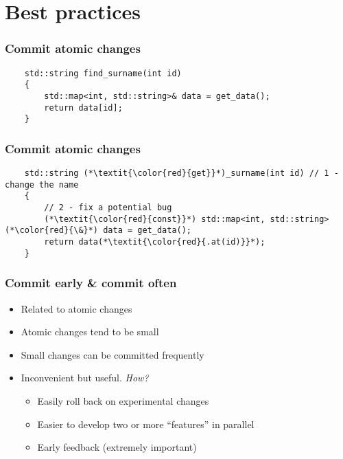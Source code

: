 \documentclass{beamer}
\begin{document}
\begin{frame}
\end{frame}

\section{Best practices}
\begin{frame}[fragile]
  \frametitle{Commit atomic changes}
  \begin{lstlisting}
    std::string find_surname(int id)
    {
        std::map<int, std::string>& data = get_data();
        return data[id];
    }
  \end{lstlisting}
\end{frame}

\begin{frame}[fragile]
  \frametitle{Commit atomic changes}
   \begin{lstlisting}
    std::string (*\textit{\color{red}{get}}*)_surname(int id) // 1 - change the name
    {
        // 2 - fix a potential bug
        (*\textit{\color{red}{const}}*) std::map<int, std::string>(*\color{red}{\&}*) data = get_data();
        return data(*\textit{\color{red}{.at(id)}}*);
    }
  \end{lstlisting}
\end{frame}

\begin{frame}
  \frametitle{Commit early \& commit often}
  \begin{itemize}
  \item<1-> Related to atomic changes
  \item<2-> Atomic changes tend to be small
  \item<3-> Small changes can be committed frequently
  \item<4-> Inconvenient but useful. \textit{How?}
    \begin{itemize}
    \item<5-> Easily roll back on experimental changes
    \item<6-> Easier to develop two or more ``features'' in parallel
    \item<7-> Early feedback (extremely important)
    \end{itemize}
  \end{itemize}
\end{frame}
\end{document}
